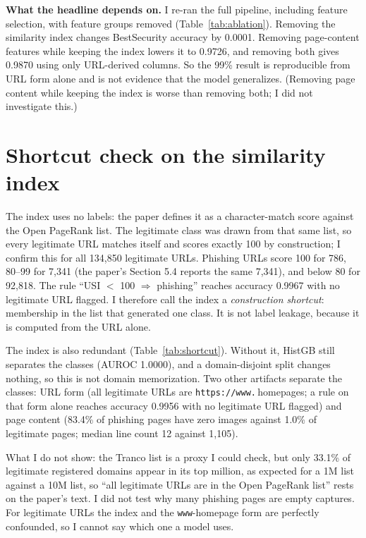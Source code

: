 \documentclass[10pt]{article}
\begin{document}
\textbf{What the headline depends on.} I re-ran the full pipeline, including feature selection, with feature groups removed (Table~\ref{tab:ablation}). Removing the similarity index changes BestSecurity accuracy by 0.0001. Removing page-content features while keeping the index lowers it to 0.9726, and removing both gives 0.9870 using only URL-derived columns. So the 99\% result is reproducible from URL form alone and is not evidence that the model generalizes. (Removing page content while keeping the index is worse than removing both; I did not investigate this.)

\begin{table}[t]
\centering
\caption{BestSecurity under the paper's protocol with feature groups removed (selection re-run each time). Shuffled: mean (sd) over four orders.}
\label{tab:ablation}

\end{table}

\section{Shortcut check on the similarity index}\label{sec:shortcut}
The index uses no labels: the paper defines it as a character-match score against the Open PageRank list. The legitimate class was drawn from that same list, so every legitimate URL matches itself and scores exactly 100 by construction; I confirm this for all 134,850 legitimate URLs. Phishing URLs score 100 for 786, 80--99 for 7,341 (the paper's Section 5.4 reports the same 7,341), and below 80 for 92,818. The rule ``USI $<$ 100 $\Rightarrow$ phishing'' reaches accuracy 0.9967 with no legitimate URL flagged. I therefore call the index a \emph{construction shortcut}: membership in the list that generated one class. It is not label leakage, because it is computed from the URL alone.

The index is also redundant (Table~\ref{tab:shortcut}). Without it, HistGB still separates the classes (AUROC 1.0000), and a domain-disjoint split changes nothing, so this is not domain memorization. Two other artifacts separate the classes: URL form (all legitimate URLs are \texttt{https://www.}\,homepages; a rule on that form alone reaches accuracy 0.9956 with no legitimate URL flagged) and page content (83.4\% of phishing pages have zero images against 1.0\% of legitimate pages; median line count 12 against 1,105).

What I do not show: the Tranco list is a proxy I could check, but only 33.1\% of legitimate registered domains appear in its top million, as expected for a 1M list against a 10M list, so ``all legitimate URLs are in the Open PageRank list'' rests on the paper's text. I did not test why many phishing pages are empty captures. For legitimate URLs the index and the \texttt{www}-homepage form are perfectly confounded, so I cannot say which one a model uses.
\end{document}
